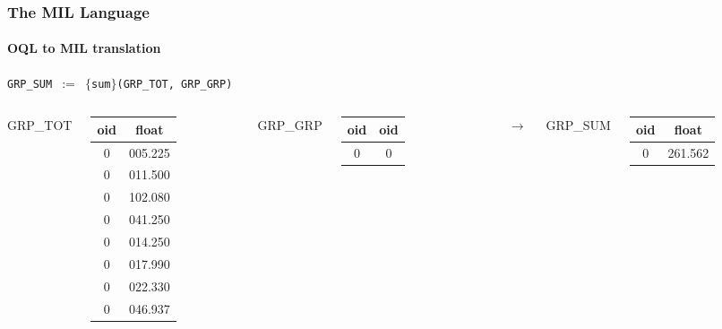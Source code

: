 \documentclass{beamer}
\begin{document}
\begin{frame}
  \frametitle{The MIL Language}
  \framesubtitle{OQL to MIL translation}

  \begin{block}{}
  {\tt GRP\_SUM $:=$ $\lbrace$sum$\rbrace$(GRP\_TOT, GRP\_GRP)}
  \end{block}

  \begin{columns}

  \column{2cm}

  GRP\_TOT
  \begin{tabular}{|c|c|}
    \hline
    oid & float \\
    \hline
    0 & 005.225 \\
    0 & 011.500 \\
    0 & 102.080 \\
    0 & 041.250 \\
    0 & 014.250 \\
    0 & 017.990 \\
    0 & 022.330 \\
    0 & 046.937 \\
    \hline
  \end{tabular}

  \column{1.5cm}

  GRP\_GRP
  \begin{tabular}{|c|c|}
    \hline
    oid & oid \\
    \hline
    0 & 0 \\
    \hline
  \end{tabular}

  \column{0.5cm}

  $\longrightarrow$

  \column{1cm}

  GRP\_SUM
  \begin{tabular}{|c|c|}
    \hline
    oid & float \\
    \hline
    0 & 261.562 \\
    \hline
  \end{tabular}

  \end{columns}

\end{frame}
\end{document}

